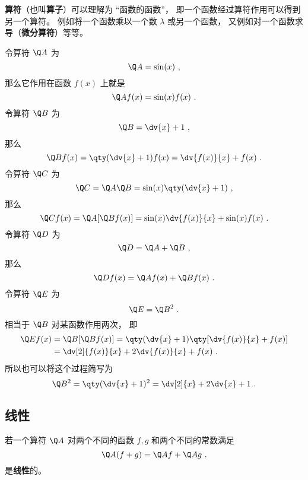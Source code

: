 

\textbf{算符}（也叫\textbf{算子}）可以理解为 “函数的函数”， 即一个函数经过算符作用可以得到另一个算符。 例如将一个函数乘以一个数 $\lambda$ 或另一个函数， 又例如对一个函数求导（\textbf{微分算符}）等等。

\begin{example}{}
令算符 $\Q A$ 为
\begin{equation}
\Q A = \sin(x)~,
\end{equation}
那么它作用在函数 $f(x)$ 上就是
\begin{equation}
\Q A f(x) = \sin(x) f(x)~.
\end{equation}
令算符 $\Q B$ 为
\begin{equation}
\Q B = \dv{x} + 1~,
\end{equation}
那么
\begin{equation}
\Q B f(x) = \qty(\dv{x} + 1)f(x) = \dv{f(x)}{x} + f(x)~.
\end{equation}
令算符 $\Q C$ 为
\begin{equation}
\Q C = \Q A \Q B = \sin(x) \qty(\dv{x} + 1)~,
\end{equation}
那么
\begin{equation}
\Q C f(x) = \Q A [\Q B f(x)] = \sin(x)\dv{f(x)}{x} + \sin(x)f(x)~.
\end{equation}
令算符 $\Q D$ 为
\begin{equation}
\Q D = \Q A + \Q B~,
\end{equation}
那么
\begin{equation}
\Q D f(x) = \Q A f(x) + \Q B f(x)~.
\end{equation}
令算符 $\Q E$ 为
\begin{equation}
\Q E = {\Q B}^2~.
\end{equation}
相当于 $\Q B$ 对某函数作用两次， 即
\begin{equation}
\begin{aligned}
\Q E f(x) &= \Q B [\Q B f(x)] = \qty(\dv{x} + 1)\qty[\dv{f(x)}{x} + f(x)] \\
&= \dv[2]{f(x)}{x} + 2\dv{f(x)}{x} + f(x)~.
\end{aligned}
\end{equation}
所以也可以将这个过程简写为
\begin{equation}
\Q B^2 = \qty(\dv{x} + 1)^2 = \dv[2]{x} + 2\dv{x} + 1~.
\end{equation}
\end{example}

\subsection{线性}
若一个算符 $\Q A$ 对两个不同的函数 $f, g$ 和两个不同的常数满足
\begin{equation}
\Q A (f + g) = \Q A f + \Q A g~.
\end{equation}
是\textbf{线性}的。
